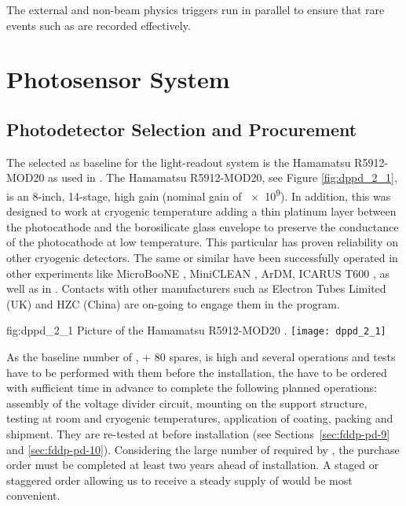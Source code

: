 The external and non-beam physics triggers run in parallel to ensure that rare events such as   are recorded effectively.

\section{Photosensor System}
\label{sec:fddp-pd-2}

\subsection{Photodetector Selection and Procurement}
\label{sec:fddp-pd-2.1}

The  %
selected as baseline for the light-readout system is the Hamamatsu R5912-MOD20  as used in . The Hamamatsu R5912-MOD20, see Figure \ref{fig:dppd_2_1}, is an 8-inch, 14-stage, high gain  (nominal gain of \num{e9}). In addition, this  was designed to work at cryogenic temperature adding a thin platinum layer between the photocathode and the borosilicate glass envelope to preserve the conductance of the photocathode at low temperature. This particular  has proven reliability on other cryogenic detectors. The same or similar  have been successfully operated in other \lar experiments like MicroBooNE \cite{microboone}, MiniCLEAN \cite{miniclean}, ArDM, ICARUS T600 \cite{icarus}, as well as in  \cite{protoDUNDP-tdr}. Contacts with other manufacturers such as Electron Tubes Limited (UK) \cite{electrontubeslim} and HZC (China) \cite{hzc} are on-going to engage them in the program.

\begin{dunefigure}{fig:dppd_2_1}
{Picture of the Hamamatsu R5912-MOD20  \cite{hamamatsu-5912}.}
\texttt{[image: dppd\_2\_1]}
\end{dunefigure}

As the baseline number of , \dpnumpmtch + \num{80} spares, is high and several operations and tests have to be performed with them before the installation, the  have to be ordered with sufficient time in advance to complete the following planned operations: assembly of the voltage divider circuit, mounting on the support structure, testing at room and cryogenic temperatures, application of  coating, packing and shipment. They are %
re-tested at \surf before installation (see Sections~\ref{sec:fddp-pd-9} and \ref{sec:fddp-pd-10}). Considering the large number of  required by \dual {}, the purchase order %
must be completed at least two years ahead of installation. A staged or staggered order allowing us to receive a steady supply of  would be most convenient. %

